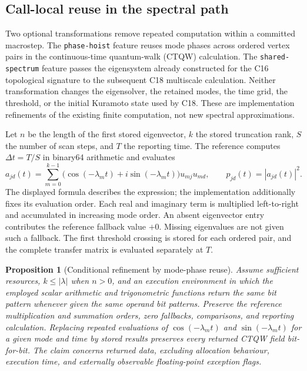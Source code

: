 \documentclass[11pt,a4paper]{article}
\newtheorem{proposition}[theorem]{Proposition}
\theoremstyle{definition}\newtheorem{definition}[theorem]{Definition}
\begin{document}
\subsection{Call-local reuse in the spectral path}
\label{sec:spectralreuse}

Two optional transformations remove repeated computation within a committed
macrostep.  The \texttt{phase-hoist} feature reuses mode phases across ordered
vertex pairs in the continuous-time quantum-walk (CTQW) calculation.  The
\texttt{shared-spectrum} feature passes the eigensystem already constructed for
the C16 topological signature to the subsequent C18 multiscale calculation.
Neither transformation changes the eigensolver, the retained modes, the time
grid, the threshold, or the initial Kuramoto state used by C18.  These are
implementation refinements of the existing finite computation, not new
spectral approximations.

Let $n$ be the length of the first stored eigenvector, $k$ the stored truncation
rank, $S$ the number of scan steps, and $T$ the reporting time.  The reference
computes $\Delta t=T/S$ in binary64 arithmetic and evaluates
\[
 a_{jd}(t)=\sum_{m=0}^{k-1}
       \bigl(\cos(-\lambda_m t)+i\sin(-\lambda_m t)\bigr)u_{mj}u_{md},
 \qquad p_{jd}(t)=|a_{jd}(t)|^2.
\]
The displayed formula describes the expression; the implementation additionally
fixes its evaluation order.  Each real and imaginary term is multiplied
left-to-right and accumulated in increasing mode order.  An absent eigenvector
entry contributes the reference fallback value $+0$.  Missing eigenvalues are
not given such a fallback.  The first threshold crossing is stored for each
ordered pair, and the complete transfer matrix is evaluated separately at $T$.

\begin{proposition}[Conditional refinement by mode-phase reuse]
\label{prop:phasehoist}
Assume sufficient resources, $k\leq\lvert\lambda\rvert$ when $n>0$, and an
execution environment in which the employed scalar arithmetic and
trigonometric functions return the same bit pattern whenever given the same
operand bit patterns.  Preserve the reference multiplication and summation
orders, zero fallbacks, comparisons, and reporting calculation.  Replacing
repeated evaluations of $\cos(-\lambda_m t)$ and $\sin(-\lambda_m t)$ for a
given mode and time by stored results preserves every returned CTQW field
bit-for-bit.  The claim concerns returned data, excluding allocation behaviour,
execution time, and externally observable floating-point exception flags.
\end{proposition}
\end{document}

